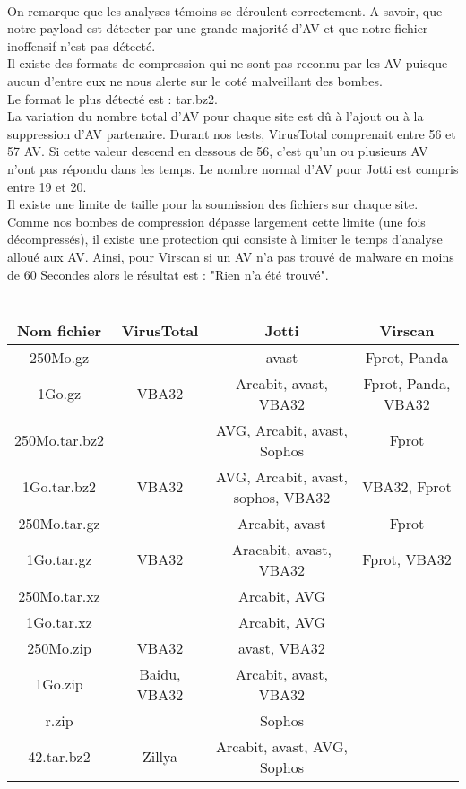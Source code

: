 \documentclass[smallextended]{svjour3}       %
\begin{document}
$ $\\
\\
On remarque que les analyses témoins se déroulent correctement. A savoir, que notre payload est détecter par une grande majorité d'AV et que notre fichier inoffensif n'est pas détecté.\\
Il existe des formats de compression qui ne sont pas reconnu par les AV puisque aucun d'entre eux ne nous alerte sur le coté malveillant des bombes.\\
Le format le plus détecté est : tar.bz2.\\
La variation du nombre total d'AV pour chaque site est dû à l'ajout ou à la suppression d'AV partenaire. Durant nos tests, VirusTotal comprenait entre 56 et 57 AV. Si cette valeur descend en dessous de 56, c'est qu'un ou plusieurs AV n'ont pas répondu dans les temps. Le nombre normal d'AV pour Jotti est compris entre 19 et 20.\\
Il existe une limite de taille pour la soumission des fichiers sur chaque site. Comme nos bombes de compression dépasse largement cette limite (une fois décompressés), il existe une protection qui consiste à limiter le temps d'analyse alloué aux AV. Ainsi, pour Virscan si un AV n'a pas trouvé de malware en moins de 60 Secondes alors le résultat est : "Rien n'a été trouvé".\\
$ $\\
\\
\begin{tabular}{|c|c|c|c|}
    \hline
     \textbf{Nom fichier} & \textbf{VirusTotal} & \textbf{Jotti} & \textbf{Virscan} \\
     \hline
    250Mo.gz &  & avast & Fprot, Panda\\
    \hline
    1Go.gz & VBA32 & Arcabit, avast, VBA32 & Fprot, Panda, VBA32\\
    \hline
    \hline
    250Mo.tar.bz2 & & AVG, Arcabit, avast, Sophos & Fprot\\
    \hline
    1Go.tar.bz2 & VBA32 & AVG, Arcabit, avast, sophos, VBA32 & VBA32, Fprot\\
    \hline
    \hline
    250Mo.tar.gz & & Arcabit, avast & Fprot\\
    \hline
    1Go.tar.gz & VBA32 & Aracabit, avast, VBA32 & Fprot, VBA32\\
    \hline
    \hline
    250Mo.tar.xz & & Arcabit, AVG & \\
    \hline
    1Go.tar.xz & & Arcabit, AVG & \\
    \hline
    \hline
    250Mo.zip & VBA32 & avast, VBA32 & \\
    \hline
    1Go.zip & Baidu, VBA32 & Arcabit, avast, VBA32 & \\
    \hline
    r.zip &  & Sophos  & \\
    \hline
    \hline
    42.tar.bz2 & Zillya & Arcabit, avast, AVG, Sophos  & \\
    \hline
\end{tabular}
\end{document}
